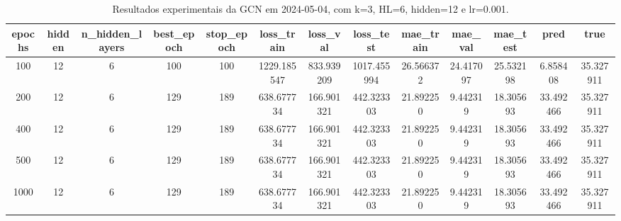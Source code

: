 \begin{table}[h]
\centering
\caption{Resultados experimentais da GCN em 2024-05-04, com k=3, HL=6, hidden=12 e lr=0.001.}
\label{tab:gcn_results_k3_hl6_h12_d20240504}
\begin{tabular}{ccccccccccccc}
\toprule
epochs & hidden & n\_hidden\_layers & best\_epoch & stop\_epoch & loss\_train & loss\_val & loss\_test & mae\_train & mae\_val & mae\_test & pred & true \\
\midrule
100 & 12 & 6 & 100 & 100 & 1229.185547 & 833.939209 & 1017.455994 & 26.566372 & 24.417097 & 25.532198 & 6.858408 & 35.327911 \\
200 & 12 & 6 & 129 & 189 & 638.677734 & 166.901321 & 442.323303 & 21.892250 & 9.442319 & 18.305693 & 33.492466 & 35.327911 \\
400 & 12 & 6 & 129 & 189 & 638.677734 & 166.901321 & 442.323303 & 21.892250 & 9.442319 & 18.305693 & 33.492466 & 35.327911 \\
500 & 12 & 6 & 129 & 189 & 638.677734 & 166.901321 & 442.323303 & 21.892250 & 9.442319 & 18.305693 & 33.492466 & 35.327911 \\
1000 & 12 & 6 & 129 & 189 & 638.677734 & 166.901321 & 442.323303 & 21.892250 & 9.442319 & 18.305693 & 33.492466 & 35.327911 \\
\bottomrule
\end{tabular}
\end{table}

